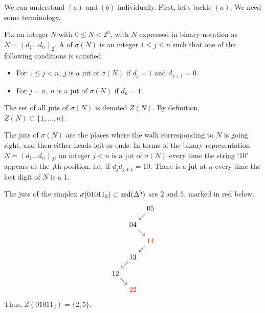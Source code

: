 \documentclass[main.tex]{subfiles}
\begin{document}
We can understand $(a)$ and $(b)$ individually. First, let's tackle $(a)$. We need some terminology.

\begin{definition}
  Fix an integer $N$ with $0 \leq N < 2^{n}$, with $N$ expressed in binary notation as $N = (d_{1} \ldots d_{n})_{2}$. A  of $\sigma(N)$ is an integer $1 \leq j \leq n$ such that one of the following conditions is satisfied:
  \begin{itemize}
    \item For $1 \leq j < n$, $j$ is a jut of $\sigma(N)$ if $d_{j} = 1$ and $d_{j + 1} = 0$.

    \item For $j = n$, $n$ is a jut of $\sigma(N)$ if $d_{n} = 1$.
  \end{itemize}

  The set of all juts of $\sigma(N)$ is denoted $Z(N)$. By definition, $Z(N) \subset \{1, \ldots, n\}$.
\end{definition}

\begin{note}
  \label{note:juts_in_binary}
  The juts of $\sigma(N)$ are the places where the walk corresponding to $N$ is going right, and then either heads left or ends. In terms of the binary representation $N = (d_{1} \ldots d_{n})_{2}$, an integer $j < n$ is a jut of $\sigma(N)$ every time the string `$10$' appears at the $j$th position, i.e.\ if $d_{j}d_{j+1} = 10$. There is a jut at $n$ every time the last digit of $N$ is a 1.
\end{note}

\begin{example}
  The juts of the simplex $\sigma(01011_{2}) \subset \mathrm{asd}(\Delta^{5})$ are $2$ and $5$, marked in red below.
  \begin{equation*}
    \begin{tikzcd}[column sep=tiny, row sep=small]
      && 05
      \arrow[dl]
      \\
      & 04
      \arrow[dr]
      \\
      && \color{red}{14}
      \arrow[dl]
      \\
      & 13
      \arrow[dl]
      \\
      12
      \arrow[dr]
      \\
      & \color{red}{22}
    \end{tikzcd}
  \end{equation*}
  Thus, $Z(01011_{2}) = \{2, 5\}$.
\end{example}
\end{document}
